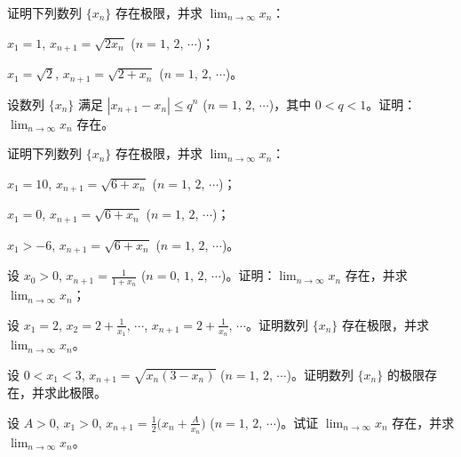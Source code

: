 	\begin{ti}
		证明下列数列 $\{x_n\}$ 存在极限，并求 $\lim_{n \to \infty} x_n$：
		\begin{xiaoti}
			\item $x_1 = 1$, $x_{n+1} = \sqrt{2x_n}$ ($n=1$, $2$, $\cdots$)；
			\item $x_1 = \sqrt{2}$, $x_{n+1} = \sqrt{2+x_n}$ ($n=1$, $2$, $\cdots$)。
		\end{xiaoti}
	\end{ti}

	\begin{ti}
		设数列 $\{x_n\}$ 满足 $|x_{n+1} - x_n| \leq q^n$ ($n=1$, $2$, $\cdots$)，其中 $0<q<1$。证明：$\lim_{n \to \infty} x_n$ 存在。
	\end{ti}

	\begin{ti}
		证明下列数列 $\{x_n\}$ 存在极限，并求 $\lim_{n \to \infty} x_n$：
		\begin{xiaoti}
			\item $x_1 = 10$, $x_{n+1} = \sqrt{6+x_n}$ ($n=1$, $2$, $\cdots$)；
			\item $x_1 = 0$, $x_{n+1} = \sqrt{6+x_n}$ ($n=1$, $2$, $\cdots$)；
			\item $x_1 > -6$, $x_{n+1} = \sqrt{6+x_n}$ ($n=1$, $2$, $\cdots$)。
		\end{xiaoti}
	\end{ti}

	\begin{ti}
		\begin{xiaoti}
			\item 设 $x_0 > 0$, $x_{n+1} = \frac{1}{1+x_n}$ ($n=0$, $1$, $2$, $\cdots$)。证明：$\lim_{n \to \infty} x_n$ 存在，并求 $\lim_{n \to \infty} x_n$；
			\item 设 $x_1 = 2$, $x_2 = 2 + \frac{1}{x_1}$, $\cdots$, $x_{n+1} = 2 + \frac{1}{x_n}$, $\cdots$。证明数列 $\{x_n\}$ 存在极限，并求 $\lim_{n \to \infty} x_n$。
		\end{xiaoti}
	\end{ti}

	\begin{ti}
		设 $0<x_1<3$, $x_{n+1} = \sqrt{x_n(3-x_n)}$ ($n=1$, $2$, $\cdots$)。证明数列 $\{x_n\}$ 的极限存在，并求此极限。
	\end{ti}

	\begin{ti}
		设 $A>0$, $x_1>0$, $x_{n+1} = \frac{1}{2} \bigl( x_n + \frac{A}{x_n} \bigr)$ ($n=1$, $2$, $\cdots$)。试证 $\lim_{n \to \infty} x_n$ 存在，并求 $\lim_{n \to \infty} x_n$。
	\end{ti}


